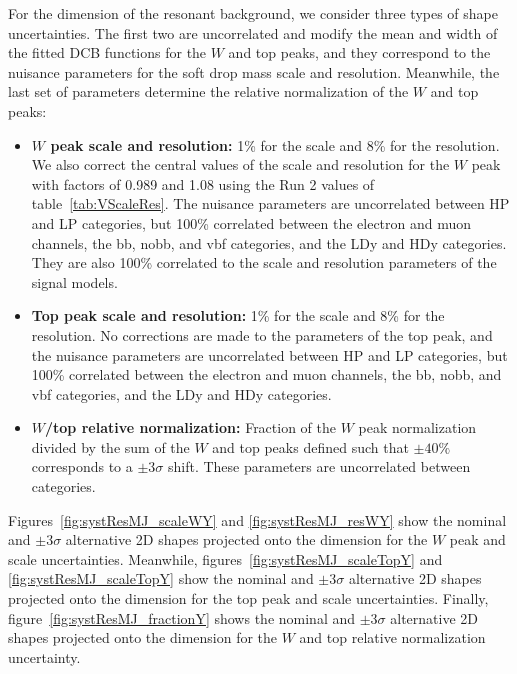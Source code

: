 For the \MJ dimension of the resonant background, we consider three types of shape uncertainties.
The first two are uncorrelated and modify the mean and width of the fitted DCB functions for the $W$ and top peaks, and they correspond to the nuisance parameters for the soft drop mass scale and resolution.
Meanwhile, the last set of parameters determine the relative normalization of the $W$ and top peaks:
\begin{itemize}
  \item {\bfseries $W$ peak scale and resolution:} 1\% for the scale and 8\% for the resolution.
  We also correct the central values of the scale and resolution for the $W$ peak with factors of 0.989 and 1.08 using the Run 2 values of table~\ref{tab:VScaleRes}.
  The nuisance parameters are uncorrelated between HP and LP categories, but 100\% correlated between the electron and muon channels, the bb, nobb, and vbf categories, and the LDy and HDy categories.
  They are also 100\% correlated to the \MJ scale and resolution parameters of the signal models.
  \item {\bfseries Top peak scale and resolution:} 1\% for the scale and 8\% for the resolution.
  No corrections are made to the parameters of the top peak, and the nuisance parameters are uncorrelated between HP and LP categories, but 100\% correlated between the electron and muon channels, the bb, nobb, and vbf categories, and the LDy and HDy categories.
  \item {\bfseries $W$/top relative normalization:} Fraction of the $W$ peak normalization divided by the sum of the $W$ and top peaks defined such that $\pm40\%$ corresponds to a $\pm3\sigma$ shift.
  These parameters are uncorrelated between categories.
\end{itemize}
Figures~\ref{fig:systResMJ_scaleWY} and \ref{fig:systResMJ_resWY} show the nominal and $\pm3\sigma$ alternative 2D shapes projected onto the \MJ dimension for the $W$ peak and scale uncertainties.
Meanwhile, figures~\ref{fig:systResMJ_scaleTopY} and \ref{fig:systResMJ_scaleTopY} show the nominal and $\pm3\sigma$ alternative 2D shapes projected onto the \MJ dimension for the top peak and scale uncertainties.
Finally, figure~\ref{fig:systResMJ_fractionY} shows the nominal and $\pm3\sigma$ alternative 2D shapes projected onto the \MJ dimension for the $W$ and top relative normalization uncertainty.

